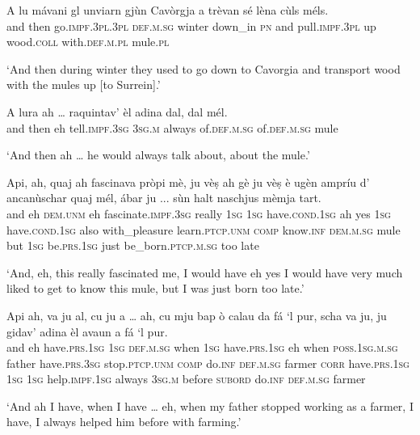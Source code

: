 \begin{linenumbers}
\gll  A lu mávani gl unviarn gjùn Cavòrgja a trèvan sé lèna cùls méls.\\
and then go.\textsc{impf.3pl.3pl} \textsc{def.m.sg} winter down\_in \textsc{pn} and pull.\textsc{impf.3pl} up wood.\textsc{coll} with.\textsc{def.m.pl} mule.\textsc{pl} \\
\end{linenumbers}
\medskip
\glt `And then during winter they used to go down to Cavorgia and transport wood with the mules up [to Surrein].'
\medskip

\begin{linenumbers}
\gll  A lura ah … raquintav’ èl adina dal, dal mél.  \\
and then eh {} tell.\textsc{impf.3sg} \textsc{3sg.m} always of.\textsc{def.m.sg} of.\textsc{def.m.sg} mule\\
\end{linenumbers}
\medskip
\glt `And  then ah … he would always talk about, about the mule.'
\medskip

\begin{linenumbers}
\gll  Api, ah, quaj ah fascinava pròpi mè, ju vèṣ ah gè ju vèṣ è ugèn ampríu d’ ancanùschar quaj mél, ábar ju ... sùn halt naschjus mèmja tart. \\
and eh \textsc{dem.unm} eh fascinate.\textsc{impf.3sg} really \textsc{1sg}  \textsc{1sg} have.\textsc{cond.1sg} ah yes \textsc{1sg} have.\textsc{cond.1sg} also with\_pleasure learn.\textsc{ptcp.unm} \textsc{comp} know.\textsc{inf} \textsc{dem.m.sg} mule but \textsc{1sg} {} be.\textsc{prs.1sg} just be\_born.\textsc{ptcp.m.sg} too late\\
\end{linenumbers}
\medskip
\glt `And, eh, this really fascinated me, I would have eh yes I would have very much liked to get to know this mule, but I was just born too late.'
\medskip

\begin{linenumbers}
\gll  Api ah, va ju al, cu ju a … ah, cu mju bap ò calau da fá `l pur, scha va ju, ju gidav’ adina èl avaun a fá `l pur.  \\
and eh  have.\textsc{prs.1sg} \textsc{1sg} \textsc{def.m.sg} when \textsc{1sg} have.\textsc{prs.1sg} {} eh when \textsc{poss.1sg.m.sg} father have.\textsc{prs.3sg} stop.\textsc{ptcp.unm} \textsc{comp} do.\textsc{inf} \textsc{def.m.sg} farmer \textsc{corr} have.\textsc{prs.1sg} \textsc{1sg} \textsc{1sg} help.\textsc{impf.1sg} always \textsc{3sg.m} before \textsc{subord} do.\textsc{inf} \textsc{def.m.sg} farmer \\
\end{linenumbers}
\medskip
\glt `And ah I have, when I have … eh, when my father stopped working as a farmer, I have, I always helped him before with farming.'
\medskip

